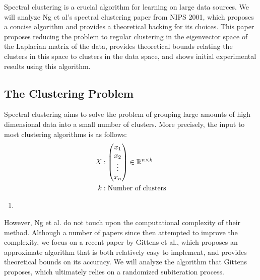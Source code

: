     Spectral clustering is a crucial algorithm for learning on large data
    sources. We will analyze Ng et al's \cite{ng2002spectral} spectral
    clustering paper from NIPS 2001, which proposes a concise algorithm and
    provides a theoretical backing for its choices. This paper proposes
    reducing the problem to regular clustering in the eigenvector space of the
    Laplacian matrix of the data, provides theoretical bounds relating the
    clusters in this space to clusters in the data space, and shows initial
    experimental results using this algorithm.

    \subsection{The Clustering Problem}
    Spectral clustering aims to solve the problem of grouping large amounts of
    high dimensional data into a small number of clusters. More precisely,
    the input to most clustering algorithms is as follows:
    \begin{align*}
    X &: \begin{pmatrix}x_1 \\ x_2 \\ \vdots \\ x_n \end{pmatrix} \in \mathbb{R}^{n \times k} \\
    k &: \text{Number of clusters}
    \end{align*}

    \begin{enumerate}
    \item
    \end{enumerate}

    However, Ng et al. do not touch upon the computational complexity of their method. Although a number of papers since then attempted to improve the complexity, we focus on a recent paper by Gittens et al.\cite{gittens2013approximate}, which proposes an approximate algorithm that is both relatively easy to implement, and provides theoretical bounds on its accuracy. We will analyze the algorithm that Gittens proposes, which ultimately relies on a randomized subiteration process.
